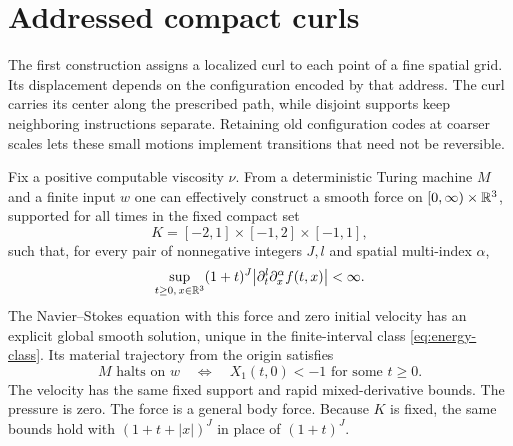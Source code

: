 \section{Addressed compact curls}
\label{sec:addressed}

The first construction assigns a localized curl to each point of a fine
spatial grid. Its displacement depends on the configuration encoded by
that address. The curl carries its center along the prescribed path,
while disjoint supports keep neighboring instructions separate. Retaining
old configuration codes at coarser scales lets these small motions
implement transitions that need not be reversible.

\begin{theorem}
\label{thm:rapid}
Fix a positive computable viscosity $\nu$. From a deterministic Turing machine $M$ and a
finite input $w$ one can effectively construct a smooth force on
$[0,\infty)\times\mathbb R^3$, supported for all times in the fixed compact set
\[
 K=[-2,1]\times[-1,2]\times[-1,1],
\]
such that, for every pair of nonnegative integers $J,l$ and spatial
multi-index $\alpha$,
\begin{equation}
 \sup_{t\geq0,\,x\in\mathbb R^3}
 (1+t)^J\bigl|\partial_t^l\partial_x^\alpha f(t,x)\bigr|<\infty.
 \label{eq:rapid-force-bound}
\end{equation}
The Navier--Stokes equation with this force and zero initial velocity has
an explicit global smooth solution, unique in the finite-interval class \eqref{eq:energy-class}.  Its material trajectory from
the origin satisfies
\begin{equation}
 M\text{ halts on }w
 \quad\Longleftrightarrow\quad
 X_1(t,0)<-1\text{ for some }t\geq0.
 \label{eq:rapid-event}
\end{equation}
The velocity has the same fixed support and rapid mixed-derivative bounds.
The pressure is zero. The force is a general body force. Because $K$ is fixed,
the same bounds hold with $(1+t+|x|)^J$ in place of $(1+t)^J$.
\end{theorem}

